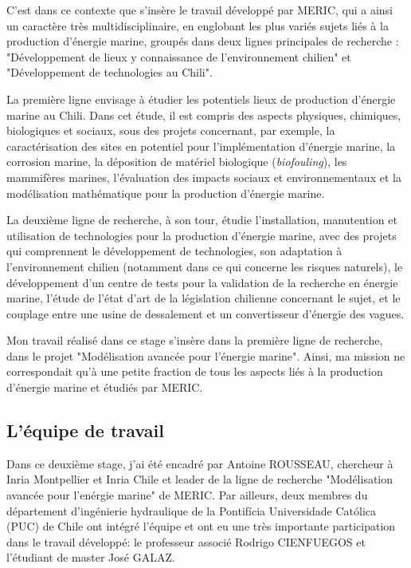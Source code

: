 \indent C'est dans ce contexte que s'insère le travail développé par MERIC, qui a ainsi un caractère très multidisciplinaire, en englobant les plus variés sujets liés à la production d'énergie marine, groupés dans deux lignes principales de recherche : "Développement de lieux y connaissance de l'environnement chilien" et "Développement de technologies au Chili".

\indent La première ligne envisage à étudier les potentiels lieux de production d'énergie marine au Chili. Dans cet étude, il est compris des aspects physiques, chimiques, biologiques et sociaux, sous des projets concernant, par exemple, la caractérisation des sites en potentiel pour l'implémentation d'énergie marine, la corrosion marine, la déposition de matériel biologique (\emph{biofouling}), les mammifères marines, l'évaluation des impacts sociaux et environnementaux et la modélisation mathématique pour la production d'énergie marine.

\indent La deuxième ligne de recherche, à son tour, étudie l'installation, manutention et utilisation de technologies pour la production d'énergie marine, avec des projets qui comprennent le développement de technologies, son adaptation à l'environnement chilien (notamment dans ce qui concerne les risques naturels), le développement d'un centre de tests pour la validation de la recherche en énergie marine, l'étude de l'état d'art de la législation chilienne concernant le sujet, et le couplage entre une usine de dessalement et un convertisseur d'énergie des vagues.

\indent Mon travail réalisé dans ce stage s'insère dans la première ligne de recherche, dans le projet "Modélisation avancée pour l'énergie marine". Ainsi, ma mission ne correspondait qu'à une petite fraction de tous les aspects liés à la production d'énergie marine et étudiés par MERIC.

\subsection{L'équipe de travail}

\indent Dans ce deuxième stage, j'ai été encadré par Antoine ROUSSEAU, chercheur à Inria Montpellier et Inria Chile et leader de la ligne de recherche "Modélisation avancée pour l'enérgie marine" de MERIC. Par ailleurs, deux membres du département d'ingénierie hydraulique de la Pontifícia  Universidade Católica (PUC) de Chile ont intégré l'équipe et ont eu une très importante participation dans le travail développé: le professeur associé Rodrigo CIENFUEGOS et l'étudiant de master José GALAZ.
